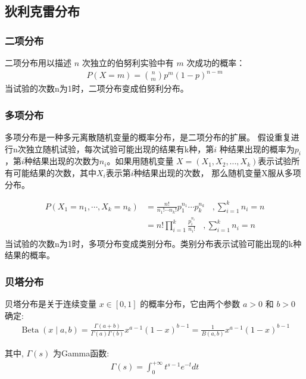 \documentclass[UTF8]{ctexart}
\numberwithin{equation}{section}
\begin{document}
\subsection{狄利克雷分布}

\subsubsection{二项分布}
二项分布用以描述 $n$ 次独立的伯努利实验中有 $m$ 次成功的概率：
$$
\begin{aligned}
P(X=m)=\binom{n}{m} p^{m}(1-p)^{n-m}
\end{aligned}
$$
当试验的次数n为1时，二项分布变成伯努利分布。

\subsubsection{多项分布}
多项分布是一种多元离散随机变量的概率分布，是二项分布的扩展。
假设重复进行n次独立随机试验，每次试验可能出现的结果有k种，第$i$
种结果出现的概率为$p_i$，第$i$种结果出现的次数为$n_i$。如果用随机变量
$X=(X_1,X_2,...,X_k)$表示试验所有可能结果的次数，其中$X_i$表示第$i$种结果出现的次数，
那么随机变量X服从多项分布。

$$
\begin{aligned}
    P\left(X_{1}=n_{1}, \cdots, X_{k}=n_{k}\right)&= \frac{n !}{n_{1} ! \cdots n_{k} !} p_{1}^{n_{1}} \cdots p_{k}^{n_{k}} ~~~~ , \sum_{i=1}^{k} n_{i}=n \\ 
&=n ! \prod_{i=1}^{k} \frac{p_{i}^{n_{i}}}{n_{i} !} ~~~~ , \sum_{i=1}^{k} n_{i}=n \\ 
\end{aligned}
$$
当试验的次数n为1时，多项分布变成类别分布。类别分布表示试验可能出现的k种结果的概率。

\subsubsection{贝塔分布}
贝塔分布是关于连续变量 $x \in[0,1]$ 的概率分布，它由两个参数 $a>0$ 和 $b>0$ 确定:
$$
\begin{aligned}
\operatorname{Beta}(x \mid a, b)=\frac{\Gamma(a+b)}{\Gamma(a) \Gamma(b)} x^{a-1}(1-x)^{b-1}=\frac{1}{B(a, b)} x^{a-1}(1-x)^{b-1}
\end{aligned}
$$

其中, $\Gamma(s)$ 为Gamma函数:
$$
\begin{aligned}
\Gamma(s)=\int_{0}^{+\infty} t^{s-1} e^{-t} d t
\end{aligned}
$$
\end{document}
